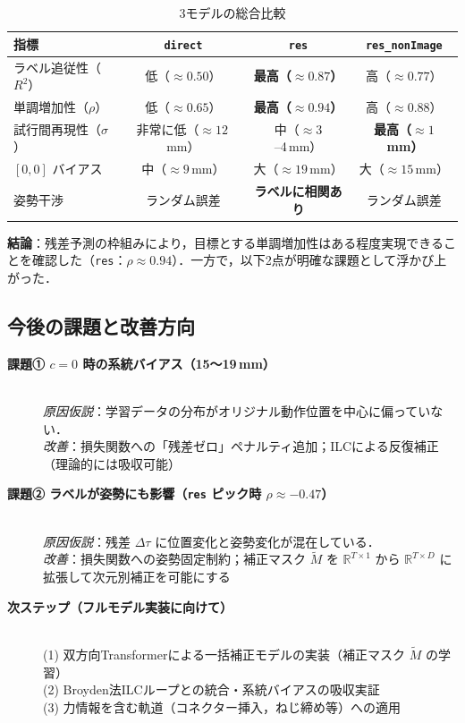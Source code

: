 \documentclass[a4paper,10pt]{jlreq}
\begin{document}
\begin{table}[h]
  \centering\small
  \caption{3モデルの総合比較}
  \begin{tabular}{lccc}
    \toprule
    指標 & \texttt{direct} & \texttt{res} & \texttt{res\_nonImage} \\
    \midrule
    ラベル追従性（$R^2$）    & 低（$\approx0.50$）     & \textbf{最高（$\approx0.87$）} & 高（$\approx0.77$） \\
    単調増加性（$\rho$）     & 低（$\approx0.65$）     & \textbf{最高（$\approx0.94$）} & 高（$\approx0.88$） \\
    試行間再現性（$\sigma$） & 非常に低（$\approx12$\,mm） & 中（$\approx3$--4\,mm） & \textbf{最高（$\approx1$\,mm）} \\
    $[0,0]$ バイアス         & 中（$\approx9$\,mm）    & 大（$\approx19$\,mm） & 大（$\approx15$\,mm） \\
    姿勢干渉                 & ランダム誤差             & \textbf{ラベルに相関あり} & ランダム誤差 \\
    \bottomrule
  \end{tabular}
\end{table}

\noindent\textbf{結論}：残差予測の枠組みにより，目標とする単調増加性はある程度実現できることを確認した（\texttt{res}：$\rho\approx0.94$）．一方で，以下2点が明確な課題として浮かび上がった．

\subsection{今後の課題と改善方向}

\begin{description}
  \item[\textbf{課題① $c=0$ 時の系統バイアス（15〜19\,mm）}]\mbox{}\\
    \textit{原因仮説}：学習データの分布がオリジナル動作位置を中心に偏っていない．\\
    \textit{改善}：損失関数への「残差ゼロ」ペナルティ追加；ILCによる反復補正（理論的には吸収可能）

  \item[\textbf{課題② ラベルが姿勢にも影響（\texttt{res} ピック時 $\rho\approx-0.47$）}]\mbox{}\\
    \textit{原因仮説}：残差 $\Delta\tau$ に位置変化と姿勢変化が混在している．\\
    \textit{改善}：損失関数への姿勢固定制約；補正マスク $\tilde{M}$ を $\mathbb{R}^{T\times1}$ から $\mathbb{R}^{T\times D}$ に拡張して次元別補正を可能にする

  \item[\textbf{次ステップ（フルモデル実装に向けて）}]\mbox{}\\
    (1) 双方向Transformerによる一括補正モデルの実装（補正マスク $\tilde{M}$ の学習）\\
    (2) Broyden法ILCループとの統合・系統バイアスの吸収実証\\
    (3) 力情報を含む軌道（コネクター挿入，ねじ締め等）への適用
\end{description}
\end{document}

